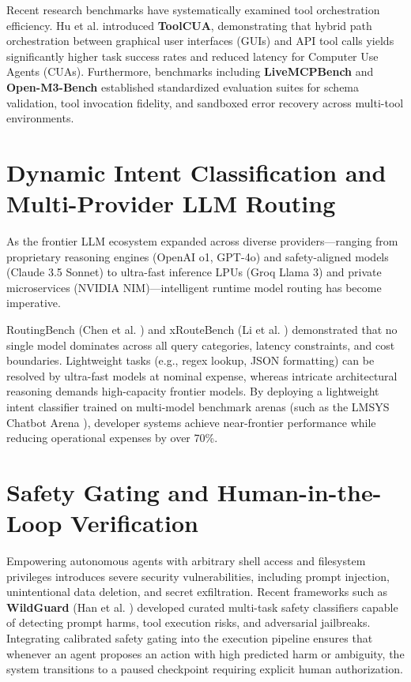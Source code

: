 \documentclass[12pt,a4paper]{report}
\begin{document}
Recent research benchmarks have systematically examined tool orchestration efficiency. Hu et al. \cite{ref_toolcua} introduced \textbf{ToolCUA}, demonstrating that hybrid path orchestration between graphical user interfaces (GUIs) and API tool calls yields significantly higher task success rates and reduced latency for Computer Use Agents (CUAs). Furthermore, benchmarks including \textbf{LiveMCPBench} \cite{ref_livemcpbench} and \textbf{Open-M3-Bench} \cite{ref_openm3} established standardized evaluation suites for schema validation, tool invocation fidelity, and sandboxed error recovery across multi-tool environments.

\section{Dynamic Intent Classification and Multi-Provider LLM Routing}
As the frontier LLM ecosystem expanded across diverse providers—ranging from proprietary reasoning engines (OpenAI o1, GPT-4o) and safety-aligned models (Claude 3.5 Sonnet) to ultra-fast inference LPUs (Groq Llama 3) and private microservices (NVIDIA NIM)—intelligent runtime model routing has become imperative.

RoutingBench (Chen et al. \cite{ref_routerbench}) and xRouteBench (Li et al. \cite{ref_xroutebench}) demonstrated that no single model dominates across all query categories, latency constraints, and cost boundaries. Lightweight tasks (e.g., regex lookup, JSON formatting) can be resolved by ultra-fast models at nominal expense, whereas intricate architectural reasoning demands high-capacity frontier models. By deploying a lightweight intent classifier trained on multi-model benchmark arenas (such as the LMSYS Chatbot Arena \cite{ref_lmsys}), developer systems achieve near-frontier performance while reducing operational expenses by over 70\%.

\section{Safety Gating and Human-in-the-Loop Verification}
Empowering autonomous agents with arbitrary shell access and filesystem privileges introduces severe security vulnerabilities, including prompt injection, unintentional data deletion, and secret exfiltration. Recent frameworks such as \textbf{WildGuard} (Han et al. \cite{ref_wildguard}) developed curated multi-task safety classifiers capable of detecting prompt harms, tool execution risks, and adversarial jailbreaks. Integrating calibrated safety gating into the execution pipeline ensures that whenever an agent proposes an action with high predicted harm or ambiguity, the system transitions to a paused checkpoint requiring explicit human authorization.
\end{document}
